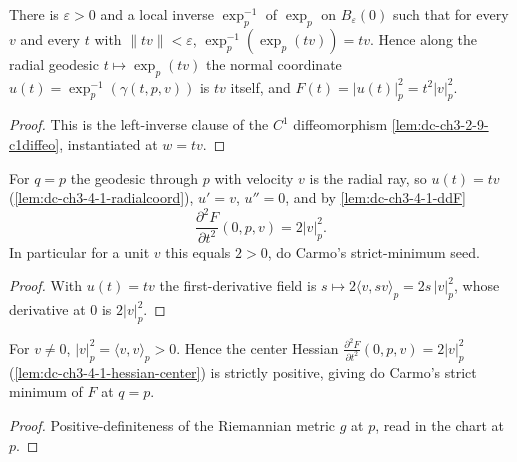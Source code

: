 \begin{lemma}
  \label{lem:dc-ch3-4-1-radialcoord}
  \leanok
  There is $\varepsilon>0$ and a local inverse $\exp_p^{-1}$ of $\exp_p$ on
  $B_\varepsilon(0)$ such that for every $v$ and every $t$ with
  $\|tv\|<\varepsilon$, $\exp_p^{-1}(\exp_p(tv))=tv$. Hence along the radial
  geodesic $t\mapsto\exp_p(tv)$ the normal coordinate $u(t)=\exp_p^{-1}(\gamma(t,p,v))$
  is $tv$ itself, and $F(t)=|u(t)|_p^2=t^2|v|_p^2$.
\end{lemma}
\begin{proof}
  \leanok
  This is the left-inverse clause of the $C^1$ diffeomorphism
  \cref{lem:dc-ch3-2-9-c1diffeo}, instantiated at $w=tv$.
\end{proof}

\begin{lemma}[center Hessian: $\partial^2 F/\partial t^2(0,p,v)=2|v|^2$]
  \label{lem:dc-ch3-4-1-hessian-center}
  \leanok
  For $q=p$ the geodesic through $p$ with velocity $v$ is the radial ray, so
  $u(t)=tv$ (\cref{lem:dc-ch3-4-1-radialcoord}), $u'=v$, $u''=0$, and by
  \cref{lem:dc-ch3-4-1-ddF}
  $$\frac{\partial^2 F}{\partial t^2}(0,p,v)=2|v|_p^2.$$
  In particular for a unit $v$ this equals $2>0$, do Carmo's strict-minimum seed.
\end{lemma}
\begin{proof}
  \leanok
  With $u(t)=tv$ the first-derivative field is
  $s\mapsto 2\langle v,sv\rangle_p=2s\,|v|_p^2$, whose derivative at $0$ is
  $2|v|_p^2$.
\end{proof}

\begin{lemma}
  \label{lem:dc-ch3-4-1-posdef}
  \leanok
  For $v\neq0$, $|v|_p^2=\langle v,v\rangle_p>0$. Hence the center Hessian
  $\frac{\partial^2 F}{\partial t^2}(0,p,v)=2|v|_p^2$
  (\cref{lem:dc-ch3-4-1-hessian-center}) is strictly positive, giving do Carmo's
  strict minimum of $F$ at $q=p$.
\end{lemma}
\begin{proof}
  \leanok
  Positive-definiteness of the Riemannian metric $g$ at $p$, read in the chart
  at $p$.
\end{proof}

